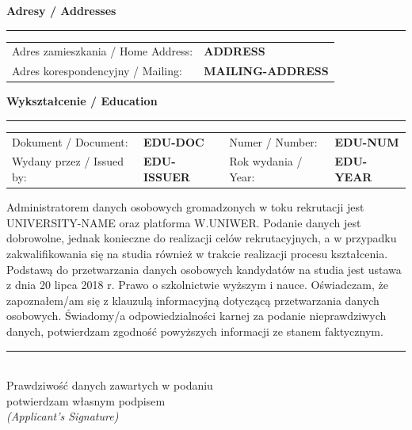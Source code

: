 \documentclass[10pt, a4paper]{article} %
\begin{document}
\begin{center}
    \large \textbf {Adresy / Addresses} \\
\end{center}
\vspace{-0.3cm}
\noindent\rule{\textwidth}{0.8pt}
\vspace{0.1cm}

\noindent
\begin{tabularx}{\textwidth}{@{}l X@{}}
\small Adres zamieszkania / Home Address: & \small \textbf{{{ADDRESS}}} \\
\small Adres korespondencyjny / Mailing: & \small \textbf{{{MAILING-ADDRESS}}} \\
\end{tabularx}

\vspace{0.3cm}

\begin{center}
    \large \textbf {Wykształcenie / Education} \\
\end{center}
\vspace{-0.3cm}
\noindent\rule{\textwidth}{0.8pt}
\vspace{0.1cm}

\noindent
\begin{tabularx}{\textwidth}{@{}l X l X@{}}
\small Dokument / Document: & \small \textbf{{{EDU-DOC}}} & \small Numer / Number: & \small \textbf{{{EDU-NUM}}} \\
\small Wydany przez / Issued by: & \small \textbf{{{EDU-ISSUER}}} & \small Rok wydania / Year: & \small \textbf{{{EDU-YEAR}}} \\
\end{tabularx}

\vspace{0.5cm} %

\noindent
\fontsize{6pt}{7pt}\selectfont %
Administratorem danych osobowych gromadzonych w toku rekrutacji jest {{UNIVERSITY-NAME}} oraz platforma W.UNIWER. Podanie danych jest dobrowolne, jednak konieczne do realizacji celów rekrutacyjnych, a w przypadku zakwalifikowania się na studia również w trakcie realizacji procesu kształcenia. Podstawą do przetwarzania danych osobowych kandydatów na studia jest ustawa z dnia 20 lipca 2018 r. Prawo o szkolnictwie wyższym i nauce. Oświadczam, że zapoznałem/am się z klauzulą informacyjną dotyczącą przetwarzania danych osobowych. Świadomy/a odpowiedzialności karnej za podanie nieprawdziwych danych, potwierdzam zgodność powyższych informacji ze stanem faktycznym.

\vspace{1.5cm} %

\hfill
\begin{minipage}{6cm}
    \centering
    \rule{6cm}{0.5pt} \\
    \vspace{0.1cm}
    \scriptsize Prawdziwość danych zawartych w podaniu \\
    potwierdzam własnym podpisem \\
    \tiny \textit{(Applicant's Signature)}
\end{minipage}
\end{document}
